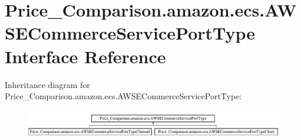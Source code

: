 \hypertarget{interface_price___comparison_1_1amazon_1_1ecs_1_1_a_w_s_e_commerce_service_port_type}{\section{Price\-\_\-\-Comparison.\-amazon.\-ecs.\-A\-W\-S\-E\-Commerce\-Service\-Port\-Type Interface Reference}
\label{interface_price___comparison_1_1amazon_1_1ecs_1_1_a_w_s_e_commerce_service_port_type}
}
Inheritance diagram for Price\-\_\-\-Comparison.\-amazon.\-ecs.\-A\-W\-S\-E\-Commerce\-Service\-Port\-Type\-:\begin{figure}[H]
\begin{center}
\leavevmode
\includegraphics[height=1.281464cm]{interface_price___comparison_1_1amazon_1_1ecs_1_1_a_w_s_e_commerce_service_port_type}
\end{center}
\end{figure}
